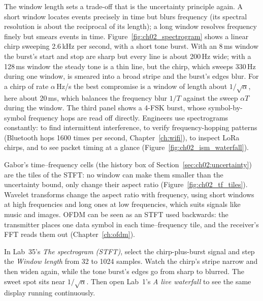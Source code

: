 The window length sets a trade-off that is the uncertainty principle again. A short window locates
events precisely in time but blurs frequency (its spectral resolution is about the reciprocal of its
length); a long window resolves frequency finely but smears events in time. Figure~\ref{fig:ch02_spectrogram}
shows a linear chirp sweeping 2.6\,kHz per second, with a short tone burst. With an 8\,ms window the
burst's start and stop are sharp but every line is about 200\,Hz wide; with a 128\,ms window the
steady tone is a thin line, but the chirp, which sweeps 330\,Hz during one window, is smeared into a
broad stripe and the burst's edges blur. For a chirp of rate $\alpha$\,Hz/s the best compromise is a
window of length about $1/\sqrt\alpha$, here about 20\,ms, which balances the frequency blur $1/T$
against the sweep $\alpha T$ during the window. The third panel shows a 4-FSK burst, whose
symbol-by-symbol frequency hops are read off directly. Engineers use spectrograms constantly: to find
intermittent interference, to verify frequency-hopping patterns (Bluetooth hops 1600 times per second,
Chapter~\ref{ch:wifi}), to inspect LoRa chirps, and to see packet timing at a glance
(Figure~\ref{fig:ch02_ism_waterfall}).



Gabor's time--frequency cells (the history box of Section~\ref{sec:ch02:uncertainty}) are the tiles of
the STFT: no window can make them smaller than the uncertainty bound, only change their aspect ratio
(Figure~\ref{fig:ch02_tf_tiles}). Wavelet transforms change the aspect ratio with frequency, using
short windows at high frequencies and long ones at low frequencies, which suits signals like music
and images. OFDM can be seen as an STFT used backwards: the transmitter places one data symbol in each
time--frequency tile, and the receiver's FFT reads them out (Chapter~\ref{ch:ofdm}).

\begin{tryit}
In Lab~35's \emph{The spectrogram (STFT)}, select the chirp-plus-burst signal and step the
\emph{Window length} from 32 to 1024 samples. Watch the chirp's stripe narrow and then widen again,
while the tone burst's edges go from sharp to blurred. The sweet spot sits near $1/\sqrt\alpha$.
Then open Lab~1's \emph{A live waterfall} to see the same display running continuously.
\end{tryit}

